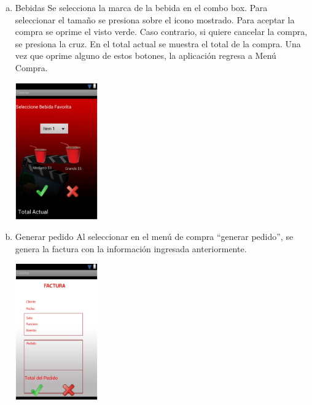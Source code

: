 \documentclass[20pt]{article}
\begin{document}
\begin{enumerate}[(a)]
\item Bebidas
Se selecciona la marca de la bebida en el combo box. Para seleccionar el tamaño se presiona sobre el icono mostrado. Para aceptar la compra se oprime el visto verde. Caso contrario, si quiere cancelar la compra, se presiona la cruz. En el total actual se muestra el total de la compra. Una vez que oprime alguno de estos botones, la aplicación regresa a Menú Compra.
\begin{center}
	\includegraphics[totalheight=1.8in,width=1.4in]{bebidas}
\end{center}


\item Generar pedido
Al seleccionar en el menú de compra “generar pedido”, se genera la factura con la información ingresada anteriormente.\\
\begin{center}
	\includegraphics[totalheight=1.8in,width=1.4in]{generar_pedido}
\end{center}


\end{enumerate}
\end{document}
